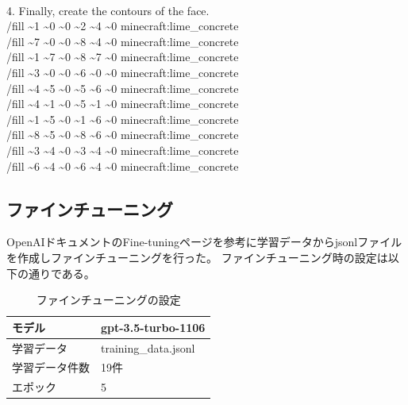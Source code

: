 {{    \\
    4. Finally, create the contours of the face.\\
    /fill \textasciitilde1 \textasciitilde0 \textasciitilde0 \textasciitilde2 \textasciitilde4 \textasciitilde0 minecraft:lime\_concrete\\
    /fill \textasciitilde7 \textasciitilde0 \textasciitilde0 \textasciitilde8 \textasciitilde4 \textasciitilde0 minecraft:lime\_concrete\\
    /fill \textasciitilde1 \textasciitilde7 \textasciitilde0 \textasciitilde8 \textasciitilde7 \textasciitilde0 minecraft:lime\_concrete\\
    /fill \textasciitilde3 \textasciitilde0 \textasciitilde0 \textasciitilde6 \textasciitilde0 \textasciitilde0 minecraft:lime\_concrete\\
    /fill \textasciitilde4 \textasciitilde5 \textasciitilde0 \textasciitilde5 \textasciitilde6 \textasciitilde0 minecraft:lime\_concrete\\
    /fill \textasciitilde4 \textasciitilde1 \textasciitilde0 \textasciitilde5 \textasciitilde1 \textasciitilde0 minecraft:lime\_concrete\\
    /fill \textasciitilde1 \textasciitilde5 \textasciitilde0 \textasciitilde1 \textasciitilde6 \textasciitilde0 minecraft:lime\_concrete\\
    /fill \textasciitilde8 \textasciitilde5 \textasciitilde0 \textasciitilde8 \textasciitilde6 \textasciitilde0 minecraft:lime\_concrete\\
    /fill \textasciitilde3 \textasciitilde4 \textasciitilde0 \textasciitilde3 \textasciitilde4 \textasciitilde0 minecraft:lime\_concrete\\
    /fill \textasciitilde6 \textasciitilde4 \textasciitilde0 \textasciitilde6 \textasciitilde4 \textasciitilde0 minecraft:lime\_concrete\\
    }
}
\newpage

\subsection{ファインチューニング}
OpenAIドキュメントのFine-tuningページ\cite{bib:fine-tuning}を参考に学習データからjsonlファイルを作成しファインチューニングを行った。
ファインチューニング時の設定は以下の通りである。

\begin{table}[H]
    \caption{ファインチューニングの設定}\label{tab:finetuning}
    \centering
    \begin{tabular}{ll}
        \hline \hline
        モデル & gpt-3.5-turbo-1106 \\
        \hline
        学習データ & training\_data.jsonl \\
        \hline
        学習データ件数 & 19件 \\
        \hline
        エポック & 5 \\
        \hline
    \end{tabular}
\end{table}